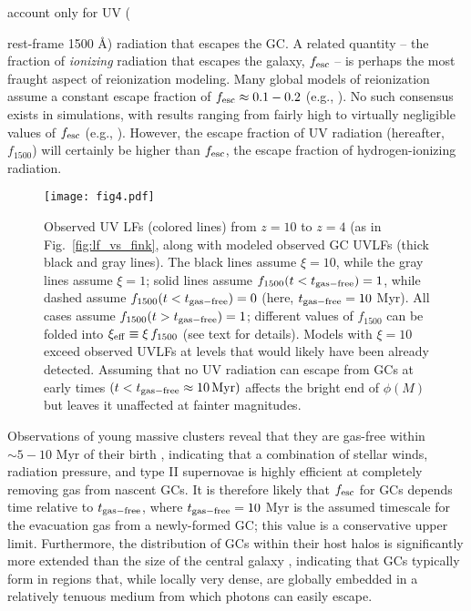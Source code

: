 \documentclass[fleqn,usenatbib]{mnras}
\newcommand{\xieff}{\xi_{\rm eff}}
\newcommand{\fescobs}{f_{1500}}
\newcommand{\tgasfree}{t_{\rm gas-free}}
\begin{document}
account only for UV ({rest-frame 1500 \AA) radiation that escapes the GC. A
  related quantity -- the fraction of \textit{ionizing} radiation that escapes
  the galaxy, $f_{\rm esc}$ -- is perhaps the most fraught aspect of reionization
  modeling. Many global models of reionization assume a constant escape fraction
  of $f_{\rm esc} \approx 0.1-0.2$ (e.g., \citealt{robertson2013, finkelstein2015,
    ishigaki2017}). No such consensus exists in simulations, with results
  ranging from fairly high to virtually negligible values of $f_{\rm esc}$ (e.g.,
  \citealt{wise2014, paardekooper2015, ma2015, xu2016, gnedin2016, anderson2017,
    howard2017a, trebitsch2017, kimm2017, zackrisson2017}). However, the escape
  fraction of UV radiation (hereafter, $\fescobs$) will certainly be higher than
  $f_{\rm esc}$, the escape fraction of hydrogen-ionizing radiation.


\begin{figure*}
  \centering
  \texttt{[image: fig4.pdf]}
  \caption{Observed UV LFs (colored lines) from $z=10$ to $z=4$ (as in
    Fig.~\ref{fig:lf_vs_fink}, along with modeled observed GC UVLFs (thick black
    and gray lines). The black lines assume $\xi=10$, while the gray lines
    assume $\xi=1$; solid lines assume $\fescobs (t<\tgasfree)=1$, while dashed
    assume $\fescobs (t<\tgasfree)=0$ (here, $\tgasfree=10$ Myr). All cases
    assume $\fescobs (t>\tgasfree)=1$; different values of $\fescobs$ can be
    folded into $\xieff \equiv \xi\,\fescobs$ (see text for details). Models
    with $\xi=10$ exceed observed UVLFs at levels that would likely have been
    already detected. Assuming that no UV radiation can escape from GCs at early
    times $(t<\tgasfree \approx 10\,{\rm Myr})$ affects the bright end of
    $\phi(M)$ but leaves it unaffected at fainter magnitudes.
 \label{fig:lf_obs_vs_fink}
}
\end{figure*}
Observations of young massive clusters reveal that they are gas-free within
$\sim 5-10$ Myr of their birth \citep{bastian2014, hollyhead2015}, indicating
that a combination of stellar winds, radiation pressure, and type II supernovae
is highly efficient at completely removing gas from nascent GCs. It is therefore
likely that $f_{\rm esc}$ for GCs depends time relative to $\tgasfree$, where
$\tgasfree=10$ Myr is the assumed timescale for the evacuation gas from a
newly-formed GC; this value is a conservative upper
limit. Furthermore, the distribution of GCs within their host halos is
significantly more extended than the size of the central galaxy
\citep{hudson2017, forbes2017}, indicating that GCs typically form in regions
that, while locally very dense, are globally embedded in a relatively tenuous
medium from which photons can easily escape.

}
\end{document}
